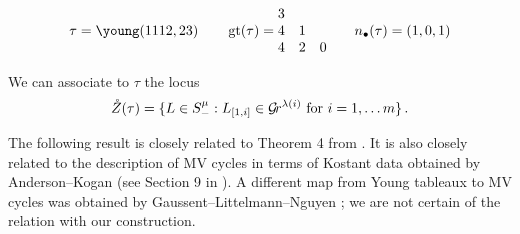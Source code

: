\documentclass{article} %
\begin{document}

    \[
        \tau = \young(1112,23) \qquad \gt(\tau) = \begin{matrix}
            3 \\
            4 & 1 \\ 
            4 & 2 & 0 
        \end{matrix} \qquad n_\bullet(\tau) = (1,0,1) %
    \]
% 
% 


We can associate to $\tau$ the locus 
%  
\begin{equation*}
    \mathring Z(\tau) = 
        \{
            L\in S^\mu_- : L_{[1,i]} \in\mathcal{G}\!r^{\lambda(i)}\text{ for } i = 1, \dots m 
        \}\,. 
\end{equation*}
% 

The following result is closely related to Theorem 4 from \cite{dranowski2020generalized}.  It is also closely related to the description of MV cycles in terms of Kostant data obtained by Anderson--Kogan \cite{anderson2004mirkovic} (see Section 9 in \cite{kamnitzer2010mirkovic}).  A different map from Young tableaux to MV cycles was obtained by Gaussent--Littelmann--Nguyen \cite[Theorem 2]{gaussent2013knuth}; we are not certain of the relation with our construction. 
\end{document}
